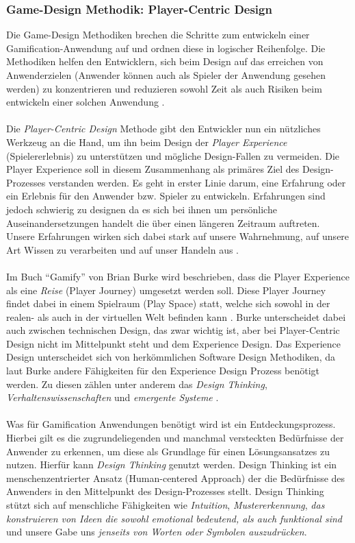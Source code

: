 \documentclass[a4paper,12pt]{scrartcl}
\begin{document}
\subsubsection{Game-Design Methodik: Player-Centric Design}
Die Game-Design Methodiken brechen die Schritte zum entwickeln einer Gamification-Anwendung auf und ordnen diese in logischer Reihenfolge. Die Methodiken helfen den Entwicklern, sich beim Design auf das erreichen von Anwenderzielen (Anwender können auch als Spieler der Anwendung gesehen werden) zu konzentrieren und reduzieren sowohl Zeit als auch Risiken beim entwickeln einer solchen Anwendung \cite{gamificationDefinition}.
\\\\
Die \textit{Player-Centric Design} Methode gibt den Entwickler nun ein nützliches Werkzeug an die Hand, um ihn beim Design der \textit{Player Experience} (Spielererlebnis) zu unterstützen und mögliche Design-Fallen zu vermeiden. Die Player Experience soll in diesem Zusammenhang als primäres Ziel des Design-Prozesses verstanden werden. Es geht in erster Linie darum, eine Erfahrung oder ein Erlebnis für den Anwender bzw. Spieler zu entwickeln. Erfahrungen sind jedoch schwierig zu designen da es sich bei ihnen um persönliche Auseinandersetzungen handelt die über einen längeren Zeitraum auftreten. Unsere Erfahrungen wirken sich dabei stark auf unsere Wahrnehmung, auf unsere Art Wissen zu verarbeiten und auf unser Handeln aus \cite{gamificationDefinition}.
\\\\ 
Im Buch \enquote{Gamify} von Brian Burke wird beschrieben, dass die Player Experience als eine \textit{Reise} (Player Journey) umgesetzt werden soll. Diese Player Journey findet dabei in einem Spielraum (Play Space) statt, welche sich sowohl in der realen- als auch in der virtuellen Welt befinden kann \cite{gamificationDefinition}. Burke unterscheidet dabei auch zwischen technischen Design, das zwar wichtig ist, aber bei Player-Centric Design nicht im Mittelpunkt steht und dem Experience Design. Das Experience Design unterscheidet sich von herkömmlichen Software Design Methodiken, da laut Burke andere Fähigkeiten für den Experience Design Prozess benötigt werden. Zu diesen zählen unter anderem das \textit{Design Thinking}, \textit{Verhaltenswissenschaften} und \textit{emergente Systeme} \cite{gamificationDefinition}.
\\\\
Was für Gamification Anwendungen benötigt wird ist ein Entdeckungsprozess. Hierbei gilt es die zugrundeliegenden und manchmal versteckten Bedürfnisse der Anwender zu erkennen, um diese als Grundlage für einen Lösungsansatzes zu nutzen. Hierfür kann \textit{Design Thinking} genutzt werden. Design Thinking ist ein menschenzentrierter Ansatz (Human-centered Approach) der die Bedürfnisse des Anwenders in den Mittelpunkt des Design-Prozesses stellt. Design Thinking stützt sich auf menschliche Fähigkeiten wie \textit{Intuition}, \textit{Mustererkennung}, \textit{das konstruieren von Ideen die sowohl emotional bedeutend, als auch funktional sind} und unsere Gabe uns \textit{jenseits von Worten oder Symbolen auszudrücken}.
\end{document}
